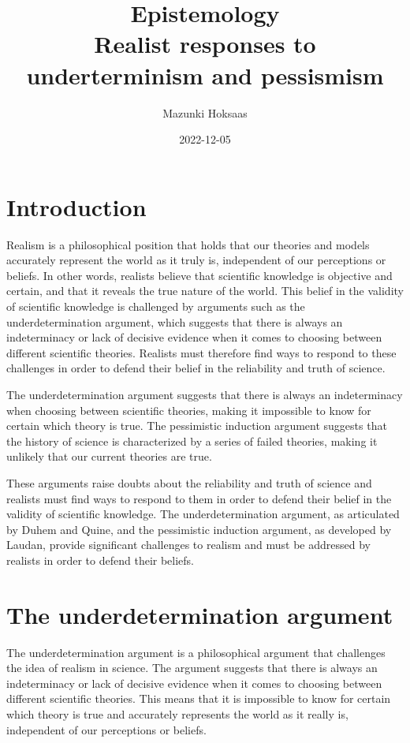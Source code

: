 \documentclass[12pt]{article}
\author{Mazunki Hoksaas}
\date{2022-12-05}
\title{Epistemology \\[1ex]\large Realist responses to underterminism and pessismism}
\begin{document}
\maketitle
	\section*{Introduction}
	Realism is a philosophical position that holds that our theories and models accurately represent the world as it truly is, independent of our perceptions or beliefs. In other words, realists believe that scientific knowledge is objective and certain, and that it reveals the true nature of the world. This belief in the validity of scientific knowledge is challenged by arguments such as the underdetermination argument, which suggests that there is always an indeterminacy or lack of decisive evidence when it comes to choosing between different scientific theories. Realists must therefore find ways to respond to these challenges in order to defend their belief in the reliability and truth of science.

	The underdetermination argument suggests that there is always an indeterminacy when choosing between scientific theories, making it impossible to know for certain which theory is true. The pessimistic induction argument suggests that the history of science is characterized by a series of failed theories, making it unlikely that our current theories are true.

	These arguments raise doubts about the reliability and truth of science and realists must find ways to respond to them in order to defend their belief in the validity of scientific knowledge. The underdetermination argument, as articulated by Duhem and Quine, and the pessimistic induction argument, as developed by Laudan, provide significant challenges to realism and must be addressed by realists in order to defend their beliefs.

	\section*{The underdetermination argument}
	The underdetermination argument is a philosophical argument that challenges the idea of realism in science. The argument suggests that there is always an indeterminacy or lack of decisive evidence when it comes to choosing between different scientific theories. This means that it is impossible to know for certain which theory is true and accurately represents the world as it really is, independent of our perceptions or beliefs.
\end{document}
